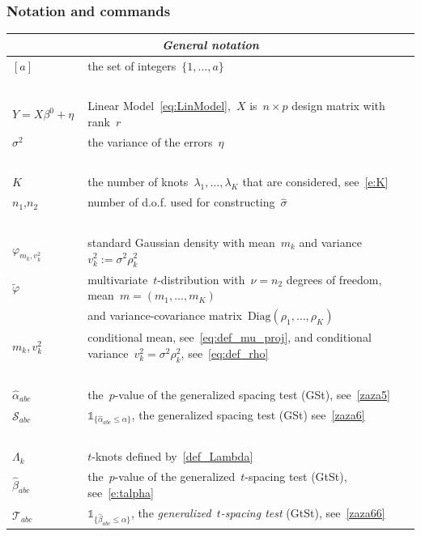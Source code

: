 \documentclass[final,numbib]{imaiai}%
\numberwithin{equation}{section}
\def\cS{\mathcal{S}}
\def\cT{\mathcal{T}}
\renewcommand{\hat}{\widehat}
\renewcommand{\tilde}{\widetilde}
\def\\bUnif{\text{\bUnif}}
\newcommand{\<}{\langle}
\renewcommand{\>}{\rangle}
\newcommand{\1}{\mathds{1}}
\begin{document}
{{\begin{tikzpicture}
\end{tikzpicture}

\vspace*{0.3cm}


\subsubsection{Notation and commands}  
\label{table:mr}
\vspace*{0.3cm}

\begin{center}
	{\small
	\begin{tabular}{ll}
		\multicolumn{2}{c}{\textit{General notation}} \\
		\midrule
		$[a]$ 
		& the set of integers~$\{1,...,a\}$ \\
		{\ } & {\ }\\
		$ Y = X \beta^0 + \eta~$ 
		&  Linear Model~\eqref{eq:LinModel},~$X$  is~$n\times p$ design matrix with rank~$r$ \\
		$\sigma^2$ 
		& the variance of the errors~$\eta$ \\
		{\ } & {\ }\\
		$K$ 
		&  the number of knots~$\lambda_1,\ldots,\lambda_K$ that are considered, see~\eqref{e:K} \\
		$n_1$,$n_2$ 
		& number of d.o.f.
used for constructing~$  \hat \sigma$ \\
		{\ } & {\ }\\
		$\varphi_{m_k, v^2_k}~$  &standard Gaussian density with mean~$m_k$ and variance~$v_k^2:=\sigma^2\rho_k^2$\\ 
		$\tilde\varphi$
		& multivariate~$t$-distribution with~$\nu=n_2$ degrees of freedom, mean~$m=(m_1,\ldots,m_K)$\\
		& and variance-covariance matrix~$\mathrm{Diag}(\rho_1,\ldots,\rho_K)$\\
		$m_k,v_k^2$ 
		& conditional mean, see~\eqref{eq:def_mu_proj}, and conditional variance~$v^2_k=\sigma^2\rho_k^2$, see~\eqref{eq:def_rho}\\
		{\ } & {\ }\\
		$ \hat \alpha_{abc}$ 
		& the~$p$-value  of the generalized spacing test (GSt), see~\eqref{zaza5}\\
		$ \cS_{abc}$ 
		& $\mathds1_{\{\hat\alpha_{abc}\leq\alpha\}}$, the generalized spacing test (GSt) see~\eqref{zaza6} \\
		{\ } & {\ }\\
		$\Lambda_k$
		& $t$-knots defined by~\eqref{def_Lambda}\\
		$\hat\beta_{abc}$
		& the~$p$-value of the generalized~$t$-spacing test (GtSt), see~\eqref{e:talpha}\\
		$ \cT_{abc}$ 
		& $\mathds1_{\{\hat\beta_{abc}\leq\alpha\}}$, the {\it generalized~$t$-spacing test} (GtSt), see~\eqref{zaza66} 
	\end{tabular}}
\end{center}

}}
\end{document}
